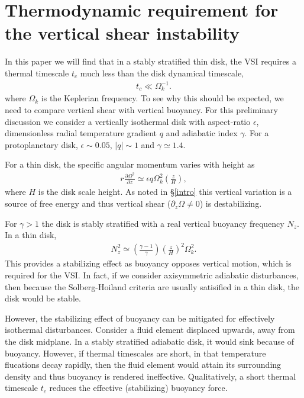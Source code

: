 \documentclass[iop]{emulateapj}
\newcommand{\p}{\partial}
\begin{document}
\section{Thermodynamic requirement for the vertical shear instability}\label{vsi_require}     In this paper we will find that in a stably stratified thin disk, the VSI  
requires a thermal timescale $t_c$ much less than the
disk dynamical timescale, 
\begin{align}
  t _c \ll \Omega_k^{-1}. 
\end{align}
where $\Omega_k$ is the Keplerian frequency. 
To see why this should be expected, we need to compare vertical shear
with vertical buoyancy. For this preliminary discussion we consider a
vertically isothermal disk with aspect-ratio $\epsilon$,  
dimensionless radial temperature gradient $q$ and adiabatic index
$\gamma$. For a protoplanetary disk, $\epsilon \sim 0.05$, $|q|\sim 1$ and $\gamma\simeq 1.4$. 

For a thin disk, the specific angular momentum varies with height as 
\begin{align}\label{vshear_thin}
  r \frac{\p \Omega^2 }{\p z} \simeq \epsilon q \Omega_k^2\left(\frac{z}{H}\right),
\end{align}
where $H$ is the disk scale height. As noted in
\S\ref{intro} this vertical variation is a source of free energy and
thus vertical shear ($\p_z\Omega \neq0$) is destabilizing. 

For $\gamma>1$ the disk is stably stratified with a real vertical
buoyancy frequency $N_z$.  In a thin disk,     
\begin{align}\label{nz_thin}
  N_z^2 \simeq \left(\frac{\gamma-1}{\gamma}\right) \left(\frac{z}{H}\right)^2
  \Omega_k^2.  
\end{align}
This provides a stabilizing effect as buoyancy opposes vertical
motion, which is required for the VSI. In fact, if we consider
axisymmetric adiabatic disturbances, then because the 
Solberg-Hoiland criteria \citep{tassoul78} are usually satisified in a
thin disk, the disk would be stable. 

However, the stabilizing effect of buoyancy can be mitigated for 
effectively isothermal disturbances. Consider a fluid element displaced upwards, away from
the disk midplane. In a stably stratified adiabatic disk, it would
sink because of buoyancy. However, if thermal timescales are short, in
that temperature flucations decay rapidly, then the fluid element would attain its surrounding 
density and  
thus buoyancy is rendered ineffective. Qualitatively, a short thermal
timescale $t_c$ reduces the effective (stabilizing) buoyancy force.    
\end{document}
